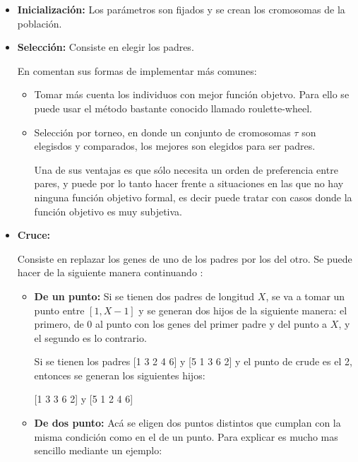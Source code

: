 \begin{itemize}

\item {\bf Inicializaci\'on:} Los par\'ametros son fijados y se
crean los cromosomas de la poblaci\'on.

\item {\bf Selecci\'on:} Consiste en elegir los padres. 

En \cite{GePo2010} comentan sus formas de implementar m\'as comunes:

\begin{itemize}

\item Tomar m\'as cuenta los individuos
con mejor funci\'on objetvo. Para ello se puede usar el m\'etodo bastante conocido
llamado roulette-wheel. 

\item Selecci\'on por torneo, en
donde un conjunto de cromosomas $\tau$ son elegisdos y comparados, los mejores
son elegidos para ser padres. 

Una de sus ventajas es que s\'olo necesita un orden de preferencia entre pares,
y puede por lo tanto hacer frente a situaciones en las que no hay ninguna función objetivo formal,
es decir puede tratar con casos donde la funci\'on objetivo es muy subjetiva.

\end{itemize}

\item {\bf Cruce:}

Consiste en replazar los genes de uno de los padres por los del otro. Se puede hacer
de la siguiente manera continuando \cite{GePo2010}:

\begin{itemize}

\item {\bf De un punto:} Si se tienen dos padres de longitud $X$, se va a tomar
un punto entre $[1,X-1]$ y se generan dos hijos de la siguiente manera: el primero,
de 0 al punto con los genes del primer padre y del punto a $X$, y el segundo es 
lo contrario.

Si se tienen los padres [1 3 2 4 6]  y [5 1 3 6 2] y el punto 
de crude es el 2, entonces se generan los siguientes hijos:

[1 3 3 6 2] y [5 1 2 4 6]

\item {\bf De dos punto:} Ac\'a se eligen dos puntos distintos que cumplan con la 
misma condici\'on como en el de un punto. Para explicar es mucho mas sencillo
mediante un ejemplo:


\end{itemize}
\end{itemize}
